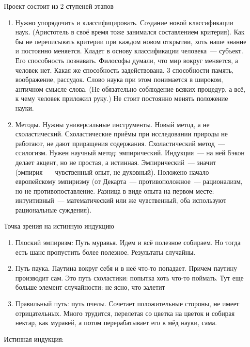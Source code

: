 Проект состоит из 2 ступеней-этапов
\begin{enumerate}
	\item Нужно упорядочить и классифицировать. Создание новой классификации наук. (Аристотель в своё время тоже занимался составлением критерия). Как бы не переписывать критерии при каждом новом открытии, хоть наше знание и постоянно меняется. Кладет в основу классификации человека~--- субъект. Его способность познавать. Философы думали, что мир вокруг меняется, а человек нет. Какая же способность задействована. 3 способности память, воображение, рассудок. Слово наука при этом понимается в широком, античном смысле слова. (Не обязательно соблюдение всяких процедур, а всё, к чему человек приложил руку.) Не стоит постоянно менять положение науки.
	\item Методы. Нужны универсальные инструменты. Новый метод, а не схоластический. Схоластические приёмы при исследовании природы не работают, не дают приращения содержания. Схоластический метод~--- ссилогизм. Нужен научный метод: эмпирический. Индукция~--- на ней Бэкон делает акцент, но не простая, а истинная. Эмпирический~--- значит (эмпирия~--- чувственный опыт, не духовный). Положено начало европейскому эмпиризму (от Декарта~--- противоположное~--- рационализм, но не противопоставление. Разница в виде опыта на первом месте: интуитивный~--- математический или же чувственный, оба используют рациональные суждения).
\end{enumerate}

Точка зрения на истинную индукцию

\begin{enumerate}
	\item Плоский эмпиризм: Путь муравья. Идем и всё полезное собираем. Но тогда есть шанс пропустить более полезное. Результаты случайны.
	\item Путь паука. Паутина вокруг себя и в неё что-то попадает. Причем паутину производит сам. Это путь схоластики: попытка хоть что-то поймать. Тут еще больше элемент случайности: не ясно, что залетит
	\item Правильный путь: путь пчелы. Сочетает положительные стороны, не имеет отрицательных. Много трудится, перелетая со цветка на цветок и собирая нектар, как муравей, а потом перерабатывает его в мёд науки, сама. 
\end{enumerate}
Истинная индукция:

